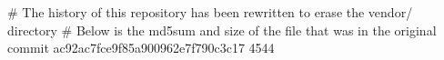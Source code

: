 # The history of this repository has been rewritten to erase the vendor/ directory
# Below is the md5sum and size of the file that was in the original commit
ac92ac7fce9f85a900962e7f790c3c17
4544
